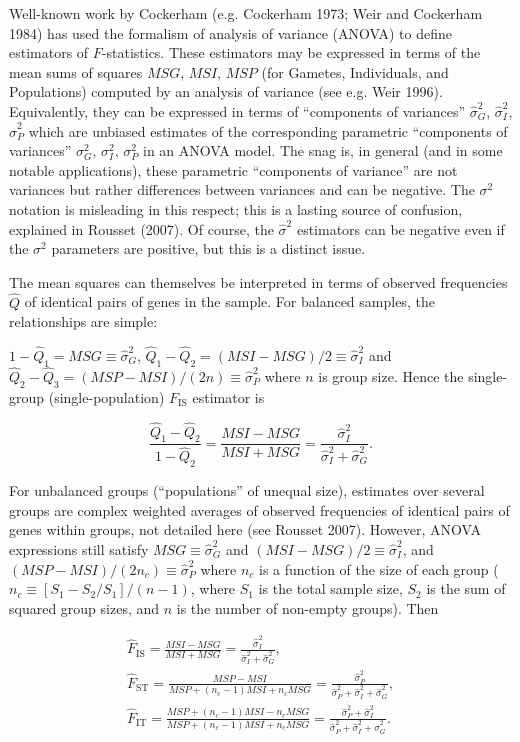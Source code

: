 \documentclass[12pt,]{book}
\begin{document}
Well-known work by Cockerham (e.g. Cockerham 1973; Weir and Cockerham
1984) has used the formalism of analysis of variance (ANOVA) to define
estimators of \(F\)-statistics. These estimators may be expressed in
terms of the mean sums of squares \(MSG\), \(MSI\), \(MSP\) (for
Gametes, Individuals, and Populations) computed by an analysis of
variance (see e.g. Weir 1996). Equivalently, they can be expressed in
terms of ``components of variances'' \(\hat{\sigma}^2_G\),
\(\hat{\sigma}^2_I\), \(\hat{\sigma}^2_P\) which are unbiased estimates
of the corresponding parametric ``components of variances''
\(\sigma^2_G\), \(\sigma^2_I\), \(\sigma^2_P\) in an ANOVA model. The
snag is, in general (and in some notable applications), these parametric
``components of variance'' are not variances but rather differences
between variances and can be negative. The \(\sigma^2\) notation is
misleading in this respect; this is a lasting source of confusion,
explained in Rousset (2007). Of course, the \(\hat{\sigma}^2\)
estimators can be negative even if the \(\sigma^2\) parameters are
positive, but this is a distinct issue.

The mean squares can themselves be interpreted in terms of observed
frequencies \(\hat{Q}\) of identical pairs of genes in the sample. For
balanced samples, the relationships are simple:

\(1-\hat{Q}_1=MSG\equiv \hat{\sigma}^2_G\),
\(\hat{Q}_1-\hat{Q}_2=(MSI-MSG)/2\equiv \hat{\sigma}^2_I\) and
\(\hat{Q}_2-\hat{Q}_3=(MSP-MSI)/(2n)\equiv \hat{\sigma}^2_P\) where
\(n\) is group size. Hence the single-group (single-population)
\(F_\mathrm{IS}\) estimator is

\[\label{}
    \frac{\hat{Q}_1-\hat{Q}_2}{1-\hat{Q}_2}=
    \frac{MSI-MSG}{MSI+MSG}=
    \frac{\hat{\sigma}^2_I}{\hat{\sigma}^2_I+\hat{\sigma}^2_G}.\]

For unbalanced groups (``populations'' of unequal size), estimates over
several groups are complex weighted averages of observed frequencies of
identical pairs of genes within groups, not detailed here (see Rousset
2007). However, ANOVA expressions still satisfy
\(MSG\equiv \hat{\sigma}^2_G\) and
\((MSI-MSG)/2\equiv \hat{\sigma}^2_I\), and
\((MSP-MSI)/(2n_c)\equiv \hat{\sigma}^2_P\) where \(n_c\) is a function
of the size of each group (\(n_c\equiv [S_1-S_2/S_1]/(n-1)\), where
\(S_1\) is the total sample size, \(S_2\) is the sum of squared group
sizes, and \(n\) is the number of non-empty groups). Then

\[\begin{gathered}
    \hat{F}_{\mathrm{IS}}=    \frac{MSI-MSG}{MSI+MSG}=
    \frac{\hat{\sigma}^2_I}{\hat{\sigma}^2_I+\hat{\sigma}^2_G}, \\
        \hat{F}_{\mathrm{ST}}=    \frac{MSP-MSI}{MSP+(n_c-1)MSI+n_cMSG}=
    \frac{\hat{\sigma}^2_P}{\hat{\sigma}^2_P+\hat{\sigma}^2_I+\hat{\sigma}^2_G}, \\
        \hat{F}_{\mathrm{IT}}=    \frac{MSP+(n_c-1)MSI-n_cMSG}{MSP+(n_c-1)MSI+n_cMSG}=
    \frac{\hat{\sigma}^2_P+\hat{\sigma}^2_I}{\hat{\sigma}^2_P+\hat{\sigma}^2_I+\hat{\sigma}^2_G}.\end{gathered}\]
\end{document}
